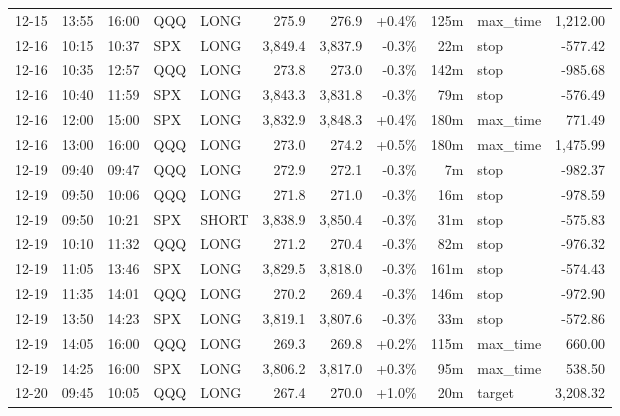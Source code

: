 \documentclass[11pt,a4paper,twoside]{article}
\begin{document}
\begin{center}
\begin{longtable}{>{\color{txtmain}}l l l l l r r r r >{\color{txtmain}}l r}
12-15 & 13:55 & 16:00 & QQQ & LONG & 275.9 & 276.9 & \textcolor{wingreen}{+0.4\%} & 125m & max\_time & \textcolor{wingreen}{1,212.00} \\
12-16 & 10:15 & 10:37 & SPX & LONG & 3,849.4 & 3,837.9 & \textcolor{lossred}{-0.3\%} & 22m & stop & \textcolor{lossred}{-577.42} \\
12-16 & 10:35 & 12:57 & QQQ & LONG & 273.8 & 273.0 & \textcolor{lossred}{-0.3\%} & 142m & stop & \textcolor{lossred}{-985.68} \\
12-16 & 10:40 & 11:59 & SPX & LONG & 3,843.3 & 3,831.8 & \textcolor{lossred}{-0.3\%} & 79m & stop & \textcolor{lossred}{-576.49} \\
12-16 & 12:00 & 15:00 & SPX & LONG & 3,832.9 & 3,848.3 & \textcolor{wingreen}{+0.4\%} & 180m & max\_time & \textcolor{wingreen}{771.49} \\
12-16 & 13:00 & 16:00 & QQQ & LONG & 273.0 & 274.2 & \textcolor{wingreen}{+0.5\%} & 180m & max\_time & \textcolor{wingreen}{1,475.99} \\
12-19 & 09:40 & 09:47 & QQQ & LONG & 272.9 & 272.1 & \textcolor{lossred}{-0.3\%} & 7m & stop & \textcolor{lossred}{-982.37} \\
12-19 & 09:50 & 10:06 & QQQ & LONG & 271.8 & 271.0 & \textcolor{lossred}{-0.3\%} & 16m & stop & \textcolor{lossred}{-978.59} \\
12-19 & 09:50 & 10:21 & SPX & SHORT & 3,838.9 & 3,850.4 & \textcolor{lossred}{-0.3\%} & 31m & stop & \textcolor{lossred}{-575.83} \\
12-19 & 10:10 & 11:32 & QQQ & LONG & 271.2 & 270.4 & \textcolor{lossred}{-0.3\%} & 82m & stop & \textcolor{lossred}{-976.32} \\
12-19 & 11:05 & 13:46 & SPX & LONG & 3,829.5 & 3,818.0 & \textcolor{lossred}{-0.3\%} & 161m & stop & \textcolor{lossred}{-574.43} \\
12-19 & 11:35 & 14:01 & QQQ & LONG & 270.2 & 269.4 & \textcolor{lossred}{-0.3\%} & 146m & stop & \textcolor{lossred}{-972.90} \\
12-19 & 13:50 & 14:23 & SPX & LONG & 3,819.1 & 3,807.6 & \textcolor{lossred}{-0.3\%} & 33m & stop & \textcolor{lossred}{-572.86} \\
12-19 & 14:05 & 16:00 & QQQ & LONG & 269.3 & 269.8 & \textcolor{wingreen}{+0.2\%} & 115m & max\_time & \textcolor{wingreen}{660.00} \\
12-19 & 14:25 & 16:00 & SPX & LONG & 3,806.2 & 3,817.0 & \textcolor{wingreen}{+0.3\%} & 95m & max\_time & \textcolor{wingreen}{538.50} \\
12-20 & 09:45 & 10:05 & QQQ & LONG & 267.4 & 270.0 & \textcolor{wingreen}{+1.0\%} & 20m & target & \textcolor{wingreen}{3,208.32} \\

\end{longtable}
\end{center}
\end{document}
